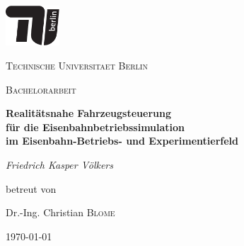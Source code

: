 \newpage
\centering
\includegraphics[width=0.15\textwidth]{../images/tu_Logo/TU_Logo_kurz_1c_schwarz.pdf}\par\vspace{1cm}
{\scshape\LARGE Technische Universitaet Berlin\par}
\vspace{1cm}
{\scshape\Large Bachelorarbeit\par}
\vspace{1.5cm}
{\huge\bfseries Realitätsnahe Fahrzeugsteuerung\\für die Eisenbahnbetriebssimulation\\im Eisenbahn-Betriebs- und Experimentierfeld\par}
\vspace{2cm}
{\Large\itshape Friedrich Kasper Völkers\par}
\vfill
betreut von\par
Dr.-Ing. Christian \textsc{Blome}

\vfill
{\large \today\par}
\justifying
\newpage